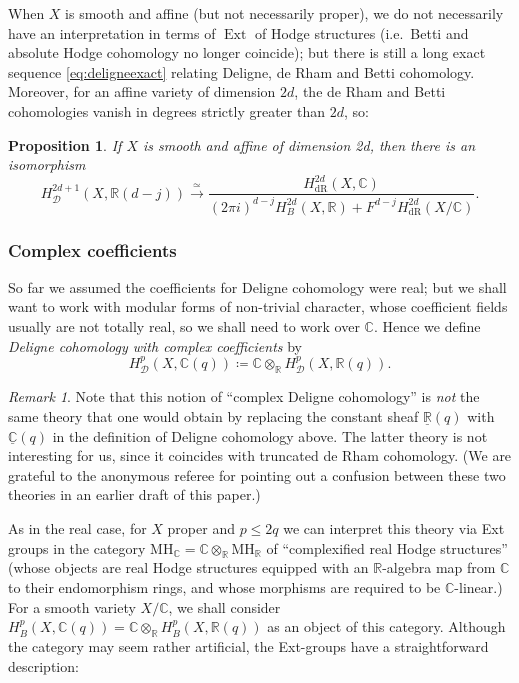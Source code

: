 \documentclass[11pt, a4paper, reqno]{amsart}
\theoremstyle{definition}
\theoremstyle{plain}
\newtheorem{proposition}[definition]{Proposition}
\theoremstyle{remark}
\newtheorem*{remark}{Remark}
\DeclareMathOperator{\Ext}{Ext}
\DeclareMathOperator{\dR}{dR}
\newcommand{\numberset}{\mathbb}
\newcommand{\C}{\numberset{C}}
\newcommand{\R}{\numberset{R}}
\newcommand{\MH}{\mathrm{MH}}
\newcommand{\del}{\mathcal{D}}
\renewcommand{\le}{\leqslant}
\begin{document}
  When $X$ is smooth and affine (but not necessarily proper), we do not necessarily have an interpretation in terms of $\Ext$ of Hodge structures (i.e.~Betti and absolute Hodge cohomology no longer coincide); but there is still a long exact sequence \eqref{eq:deligneexact} relating Deligne, de Rham and Betti cohomology. Moreover, for an affine variety of dimension $2d$, the de Rham and Betti cohomologies vanish in degrees strictly greater than $2d$, so:

  \begin{proposition}
   \label{prop:isomorphism-for-affine-deligne}
   If $X$ is smooth and affine of dimension 2d, then there is an isomorphism
   \[
    H_{\del}^{2d+1}(X, \R(d-j)) \xrightarrow{\simeq}
    \frac{H^{2d}_{\dR}(X, \C)}{(2\pi i)^{d-j} H^{2d}_B(X, \R) + F^{d-j} H^{2d}_{\dR}(X/\C)}.
   \]
  \end{proposition}

 \subsubsection*{Complex coefficients}
  
  So far we assumed the coefficients for Deligne cohomology were real; but we shall want to work with modular forms of non-trivial character, whose coefficient fields usually are not totally real, so we shall  need to work over $\C$. Hence we define \emph{Deligne cohomology with complex coefficients} by 
  \[ H^p_{\del}(X, \C(q)) \coloneqq \C \otimes_{\R} H^p_{\del}(X, \R(q)).\]
  
  \begin{remark}
   Note that this notion of ``complex Deligne cohomology'' is \emph{not} the same theory that one would obtain by replacing the constant sheaf $\underline{\R}(q)$ with $\underline{\C}(q)$ in the definition of Deligne cohomology above. The latter theory is not interesting for us, since it coincides with truncated de Rham cohomology. (We are grateful to the anonymous referee for pointing out a confusion between these two theories in an earlier draft of this paper.)
  \end{remark}
    
  As in the real case, for $X$ proper and $p \le 2q$ we can interpret this theory via Ext groups in the category $\MH_\C = \C \otimes_{\R} \MH_{\R}$ of ``complexified real Hodge structures'' (whose objects are real Hodge structures equipped with an $\R$-algebra map from $\C$ to their endomorphism rings, and whose morphisms are required to be $\C$-linear.) For a smooth variety $X / \C$, we shall consider $H^p_B(X, \C(q)) = \C\otimes_\R H^p_B(X, \R(q))$ as an object of this category. Although the category may seem rather artificial, the Ext-groups have a straightforward description:
  
\end{document}
